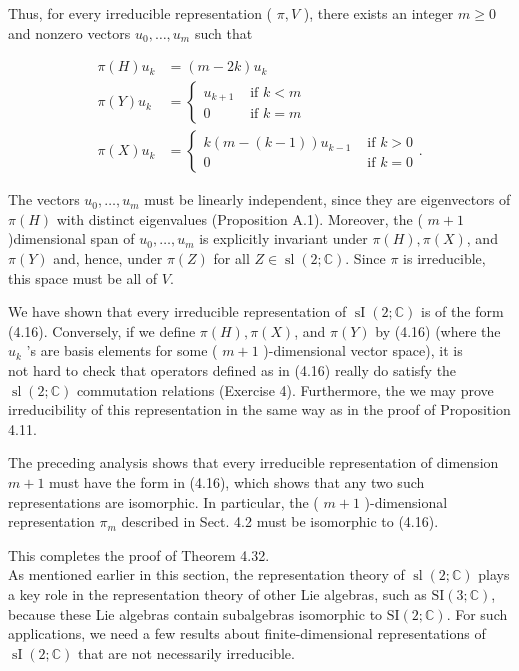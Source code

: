 \documentclass[10pt, letterpaper]{article}
\begin{document}
Thus, for every irreducible representation ( $\pi, V$ ), there exists an integer $m \geq 0$ and nonzero vectors $u_{0}, \ldots, u_{m}$ such that

$$
\begin{aligned}
\pi(H) u_{k} & =(m-2 k) u_{k} \\
\pi(Y) u_{k} & =\left\{\begin{array}{cll}
u_{k+1} & \text { if } k<m \\
0 & \text { if } k=m
\end{array}\right. \\
\pi(X) u_{k} & =\left\{\begin{array}{cc}
k(m-(k-1)) u_{k-1} & \text { if } k>0 \\
0 & \text { if } k=0
\end{array} .\right.
\end{aligned}
$$

The vectors $u_{0}, \ldots, u_{m}$ must be linearly independent, since they are eigenvectors of $\pi(H)$ with distinct eigenvalues (Proposition A.1). Moreover, the ( $m+1$ )dimensional span of $u_{0}, \ldots, u_{m}$ is explicitly invariant under $\pi(H), \pi(X)$, and $\pi(Y)$ and, hence, under $\pi(Z)$ for all $Z \in \operatorname{sl}(2 ; \mathbb{C})$. Since $\pi$ is irreducible, this space must be all of $V$.

We have shown that every irreducible representation of $\operatorname{sI}(2 ; \mathbb{C})$ is of the form (4.16). Conversely, if we define $\pi(H), \pi(X)$, and $\pi(Y)$ by (4.16) (where the $u_{k}$ 's are basis elements for some ( $m+1$ )-dimensional vector space), it is\\
not hard to check that operators defined as in (4.16) really do satisfy the $\operatorname{sl}(2 ; \mathbb{C})$ commutation relations (Exercise 4). Furthermore, the we may prove irreducibility of this representation in the same way as in the proof of Proposition 4.11.

The preceding analysis shows that every irreducible representation of dimension $m+1$ must have the form in (4.16), which shows that any two such representations are isomorphic. In particular, the ( $m+1$ )-dimensional representation $\pi_{m}$ described in Sect. 4.2 must be isomorphic to (4.16).

This completes the proof of Theorem 4.32.\\
As mentioned earlier in this section, the representation theory of $\operatorname{sl}(2 ; \mathbb{C})$ plays a key role in the representation theory of other Lie algebras, such as $\mathrm{SI}(3 ; \mathbb{C})$, because these Lie algebras contain subalgebras isomorphic to $\mathrm{SI}(2 ; \mathbb{C})$. For such applications, we need a few results about finite-dimensional representations of $\operatorname{sI}(2 ; \mathbb{C})$ that are not necessarily irreducible.
\end{document}
